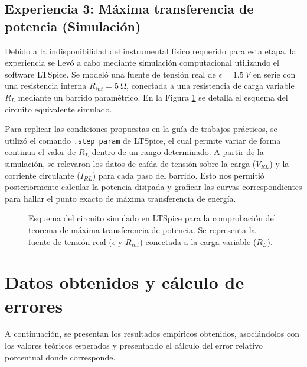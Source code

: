 \documentclass[11pt]{article}
\begin{document}
\subsection*{Experiencia 3: Máxima transferencia de potencia (Simulación)}

Debido a la indisponibilidad del instrumental físico requerido para esta etapa, la experiencia se llevó a cabo mediante simulación computacional utilizando el software LTSpice. Se modeló una fuente de tensión real de $\epsilon = \SI{1.5}{V}$ en serie con una resistencia interna $R_{int} = \SI{5}{\ohm}$, conectada a una resistencia de carga variable $R_L$ mediante un barrido paramétrico. En la Figura \ref{fig:ltspice} se detalla el esquema del circuito equivalente simulado.

Para replicar las condiciones propuestas en la guía de trabajos prácticos, se utilizó el comando \texttt{.step param} de LTSpice, el cual permite variar de forma continua el valor de $R_L$ dentro de un rango determinado. A partir de la simulación, se relevaron los datos de caída de tensión sobre la carga ($V_{RL}$) y la corriente circulante ($I_{RL}$) para cada paso del barrido. Esto nos permitió posteriormente calcular la potencia disipada y graficar las curvas correspondientes para hallar el punto exacto de máxima transferencia de energía.

\begin{figure}[H]
    \centering
    \caption{Esquema del circuito simulado en LTSpice para la comprobación del teorema de máxima transferencia de potencia. Se representa la fuente de tensión real ($\epsilon$ y $R_{int}$) conectada a la carga variable ($R_L$).}
    \label{fig:ltspice}
\end{figure}

\section{Datos obtenidos y cálculo de errores}

A continuación, se presentan los resultados empíricos obtenidos, asociándolos con los valores teóricos esperados y presentando el cálculo del error relativo porcentual donde corresponde.
\end{document}
